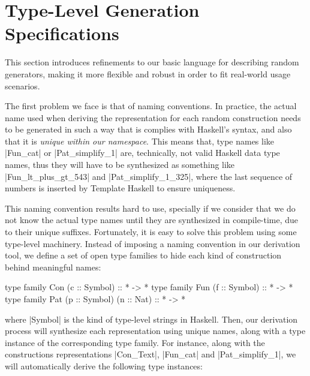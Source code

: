 \section{Type-Level Generation Specifications}
\label{sec:typelevel}

%
This section introduces refinements to our basic language for describing random
generators, making it more flexible and robust in order to fit real-world usage
scenarios.


%
%
%
The first problem we face is that of naming conventions.
%
In practice, the actual name used when deriving the representation for each
random construction needs to be generated in such a way that is complies with
Haskell's syntax, and also that it is \emph{unique within our namespace}.
%
This means that, type names like |Fun_cat| or |Pat_simplify_1| are, technically,
not valid Haskell data type names, thus they will have to be synthesized as
something like |Fun_lt_plus_gt_543| and |Pat_simplify_1_325|, where the last
sequence of numbers is inserted by Template Haskell to ensure uniqueness.


This naming convention results hard to use, specially if we consider that we do
not know the actual type names until they are synthesized in compile-time, due
to their unique suffixes.
%
Fortunately, it is easy to solve this problem using some type-level machinery.
%
Instead of imposing a naming convention in our derivation tool, we define a set
of open type families to hide each kind of construction behind meaningful names:

\begin{code}
type family Con (c :: Symbol)             :: * -> *
type family Fun (f :: Symbol)             :: * -> *
type family Pat (p :: Symbol) (n :: Nat)  :: * -> *
\end{code}
%
where |Symbol| is the kind of type-level strings in Haskell.
%
Then, our derivation process will synthesize each representation using unique
names, along with a type instance of the corresponding type family.
%
For instance, along with the constructions representations |Con_Text|, |Fun_cat|
and |Pat_simplify_1|, we will automatically derive the following type instances:

